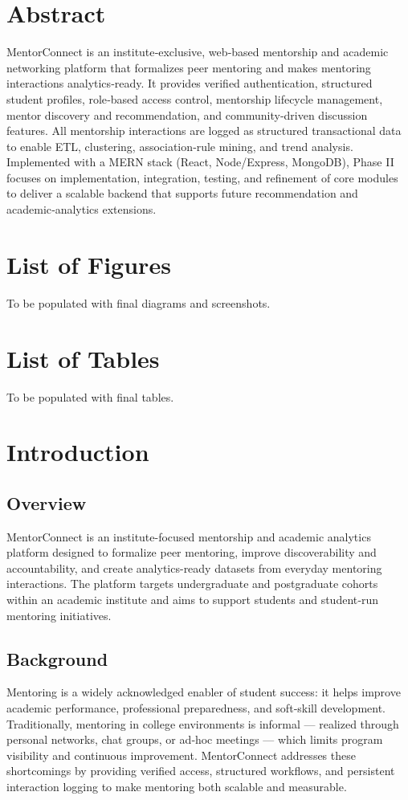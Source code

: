\documentclass[12pt,singleside,a4paper]{article}
\begin{document}
\section*{Abstract}
MentorConnect is an institute‑exclusive, web‑based mentorship and academic networking platform that formalizes peer mentoring and makes mentoring interactions analytics‑ready. It provides verified authentication, structured student profiles, role‑based access control, mentorship lifecycle management, mentor discovery and recommendation, and community‑driven discussion features. All mentorship interactions are logged as structured transactional data to enable ETL, clustering, association‑rule mining, and trend analysis. Implemented with a MERN stack (React, Node/Express, MongoDB), Phase II focuses on implementation, integration, testing, and refinement of core modules to deliver a scalable backend that supports future recommendation and academic‑analytics extensions.
\newpage

\section*{List of Figures}
To be populated with final diagrams and screenshots.
\section*{List of Tables}
To be populated with final tables.
\newpage

\tableofcontents
\newpage

\section{Introduction}
\subsection{Overview}
MentorConnect is an institute-focused mentorship and academic analytics platform designed to formalize peer mentoring, improve discoverability and accountability, and create analytics-ready datasets from everyday mentoring interactions. The platform targets undergraduate and postgraduate cohorts within an academic institute and aims to support students and student‑run mentoring initiatives.

\subsection{Background}
Mentoring is a widely acknowledged enabler of student success: it helps improve academic performance, professional preparedness, and soft‑skill development. Traditionally, mentoring in college environments is informal — realized through personal networks, chat groups, or ad‑hoc meetings — which limits program visibility and continuous improvement. MentorConnect addresses these shortcomings by providing verified access, structured workflows, and persistent interaction logging to make mentoring both scalable and measurable.
\end{document}
